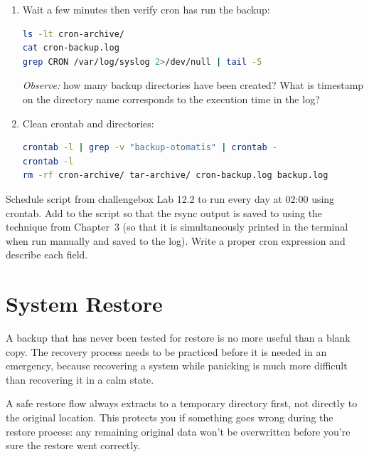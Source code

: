 \begin{enumerate}
\item Wait a few minutes then verify cron has run the backup:
\begin{lstlisting}[language=bash, caption={Verify cron automatic execution}]
ls -lt cron-archive/
cat cron-backup.log
grep CRON /var/log/syslog 2>/dev/null | tail -5
\end{lstlisting}
\textit{Observe:} how many backup directories have been created? What is timestamp
on the directory name corresponds to the execution time in the log?

\item Clean crontab and directories:
\begin{lstlisting}[language=bash, caption={Clean crontab and backup results}]
crontab -l | grep -v "backup-otomatis" | crontab -
crontab -l
rm -rf cron-archive/ tar-archive/ cron-backup.log backup.log
\end{lstlisting}
\end{enumerate}

\begin{challengebox}
Schedule script  from challengebox Lab 12.2 to run every day at 02:00 using crontab. Add to the script so that the rsync output is saved to  using the  technique from Chapter~3 (so that it is simultaneously printed in the terminal when run manually and saved to the log). Write a proper cron expression and describe each field.
\end{challengebox}

\section{System Restore}
\label{sec:backup-recovery}

A backup that has never been tested for restore is no more useful than a blank copy. The recovery process needs to be practiced before it is needed in an emergency, because recovering a system while panicking is much more difficult than recovering it in a calm state.

A safe restore flow always extracts to a temporary directory first, not directly to the original location. This protects you if something goes wrong during the restore process: any remaining original data won't be overwritten before you're sure the restore went correctly.

